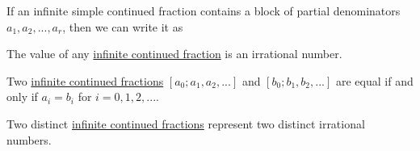 \documentclass{article}
\newcounter{theorem}[section]
\newcounter{definition}[section]
\begin{document}
\begin{definition}
  \label{def:infinite-simple-continued-fraction-contains}
If an infinite simple continued fraction contains a block of partial denominators $a_1, a_2, ..., a_r$, then we can write it as
\begin{equation}
  [a_0; \overline{a_1, a_2, ..., a_n}]
\end{equation}
\end{definition}

\begin{theorem}
  \label{thm:value-infinite-continued-fraction-irrational}
The value of any \hyperref[def:infinite-continued-fraction]{infinite continued fraction} is an irrational number. 
\end{theorem}

\begin{theorem}
  \label{thm:two-infinite-continued-fractions-equal}
Two \hyperref[def:infinite-continued-fraction]{infinite continued fractions} $[a_0; a_1, a_2, ...]$ and $[b_0; b_1, b_2, ...]$ are equal if and only if $a_i = b_i$ for $i = 0, 1, 2, ...$. 
\end{theorem}

\begin{corollary}
  \label{thm:two-distinct-infinite-continued-fractions}
Two distinct \hyperref[def:infinite-continued-fraction]{infinite continued fractions} represent two distinct irrational numbers. 
\end{corollary}
\end{document}
